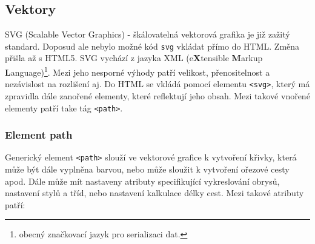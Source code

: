 \subsection{Vektory}
SVG (Scalable Vector Graphics) - škálovatelná vektorová grafika je již zažitý standard. Doposud ale nebylo možné kód \texttt{svg} vkládat přímo do HTML. Změna přišla až s HTML5. SVG vychází z jazyka XML (e\textbf{X}tensible \textbf{M}arkup \textbf{L}anguage)\footnote{obecný značkovací jazyk pro serializaci dat.}. Mezi jeho nesporné výhody patří velikost, přenositelnost a nezávislost na rozlišení aj. Do HTML se vkládá pomocí elementu \texttt{<svg>}, který má zpravidla dále zanořené elementy, které reflektují jeho obsah. Mezi takové vnořené elementy patří take tág \texttt{<path>}.


\subsubsection{Element path}
Generický element \texttt{<path>} slouží ve vektorové grafice k vytvoření křivky, která může být dále vyplněna barvou, nebo může sloužit k vytvoření ořezové cesty apod. Dále může mít nastaveny atributy specifikující vykreslování obrysů, nastavení stylů a tříd, nebo nastavení kalkulace délky cest. Mezi takové atributy patří:

